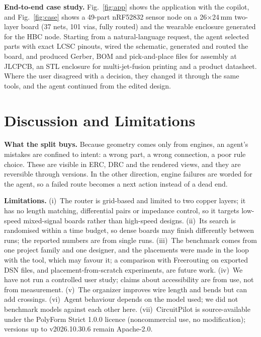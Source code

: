 \documentclass[journal]{IEEEtran}
\begin{document}
\textbf{End-to-end case study.} Fig.~\ref{fig:app} shows the application with the copilot, and Fig.~\ref{fig:case} shows a 49-part nRF52832 sensor node on a 26$\times$24\,mm two-layer board (37 nets, 101 vias, fully routed) and the wearable enclosure generated for the HBC node. Starting from a natural-language request, the agent selected parts with exact LCSC pinouts, wired the schematic, generated and routed the board, and produced Gerber, BOM and pick-and-place files for assembly at JLCPCB, an STL enclosure for multi-jet-fusion printing and a product datasheet. Where the user disagreed with a decision, they changed it through the same tools, and the agent continued from the edited design.



\section{Discussion and Limitations}
\label{sec:disc}

\textbf{What the split buys.} Because geometry comes only from engines, an agent's mistakes are confined to intent: a wrong part, a wrong connection, a poor rule choice. These are visible in ERC, DRC and the rendered views, and they are reversible through versions. In the other direction, engine failures are worded for the agent, so a failed route becomes a next action instead of a dead end.

\textbf{Limitations.} (i)~The router is grid-based and limited to two copper layers; it has no length matching, differential pairs or impedance control, so it targets low-speed mixed-signal boards rather than high-speed designs. (ii)~Its search is randomised within a time budget, so dense boards may finish differently between runs; the reported numbers are from single runs. (iii)~The benchmark comes from one project family and one designer, and the placements were made in the loop with the tool, which may favour it; a comparison with Freerouting on exported DSN files, and placement-from-scratch experiments, are future work. (iv)~We have not run a controlled user study; claims about accessibility are from use, not from measurement. (v)~The organizer improves wire length and bends but can add crossings. (vi)~Agent behaviour depends on the model used; we did not benchmark models against each other here. (vii)~CircuitPilot is source-available under the PolyForm Strict 1.0.0 licence (noncommercial use, no modification); versions up to v2026.10.30.6 remain Apache-2.0.
\end{document}
